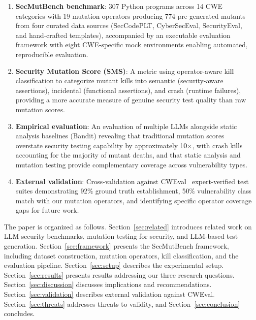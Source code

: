 \documentclass[sigconf,review,anonymous]{acmart}
\begin{document}
\begin{enumerate}
    \item \textbf{SecMutBench benchmark}: 307 Python programs across 14 CWE categories with 19 mutation operators producing 774 pre-generated mutants from four curated data sources (SecCodePLT, CyberSecEval, SecurityEval, and hand-crafted templates), accompanied by an executable evaluation framework with eight CWE-specific mock environments enabling automated, reproducible evaluation.
    
    \item \textbf{Security Mutation Score (SMS)}: A metric using operator-aware kill classification to categorize mutant kills into semantic (security-aware assertions), incidental (functional assertions), and crash (runtime failures), providing a more accurate measure of genuine security test quality than raw mutation scores.
    
    \item \textbf{Empirical evaluation}: An evaluation of multiple LLMs alongside static analysis baselines (Bandit) revealing that traditional mutation scores overstate security testing capability by approximately 10$\times$, with crash kills accounting for the majority of mutant deaths, and that static analysis and mutation testing provide complementary coverage across vulnerability types.
    
    \item \textbf{External validation}: Cross-validation against CWEval~\cite{yang2024cweval} expert-verified test suites demonstrating 92\% ground truth establishment, 50\% vulnerability class match with our mutation operators, and identifying specific operator coverage gaps for future work.
\end{enumerate}

The paper is organized as follows. Section~\ref{sec:related} introduces related work on LLM security benchmarks, mutation testing for security, and LLM-based test generation. Section~\ref{sec:framework} presents the SecMutBench framework, including dataset construction, mutation operators, kill classification, and the evaluation pipeline. Section~\ref{sec:setup} describes the experimental setup. Section~\ref{sec:results} presents results addressing our three research questions. Section~\ref{sec:discussion} discusses implications and recommendations. Section~\ref{sec:validation} describes external validation against CWEval. Section~\ref{sec:threats} addresses threats to validity, and Section~\ref{sec:conclusion} concludes.
\end{document}
